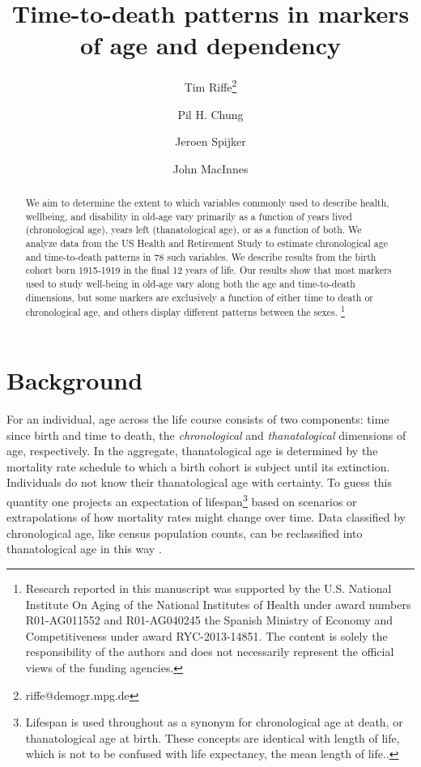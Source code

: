 \documentclass[11pt,oneside]{article} %
\newcommand\ackn[1]{%
  \begingroup
  \renewcommand\thefootnote{}\footnote{#1}%
  \addtocounter{footnote}{-1}%
  \endgroup
}
\begin{document}
\title{Time-to-death patterns in markers of age and dependency}

\author[1]{Tim Riffe\thanks{riffe@demogr.mpg.de}}
\author[1]{Pil H. Chung}
\author[2]{Jeroen Spijker}
\author[3]{John MacInnes}



\maketitle

\begin{abstract}
We aim to determine the extent to which variables commonly
used to describe health, wellbeing, and disability in old-age vary primarily
as a function of years lived (chronological age), years left (thanatological
age), or as a function of both.
We analyze data from the US Health and Retirement Study to estimate chronological age and time-to-death patterns in 78 such variables. We describe
results from the birth cohort born 1915-1919 in the final 12 years of life. Our results show
that most markers used to study well-being in old-age vary along both the age
and time-to-death dimensions, but some markers are exclusively a function of
either time to death or chronological age, and others display different patterns
between the sexes.\ackn{Research reported in this manuscript
was supported by the U.S.
National Institute On Aging of the National Institutes of Health under award
numbers R01-AG011552 and R01-AG040245 the Spanish Ministry of Economy and
Competitiveness under award RYC-2013-14851. The content is solely the
responsibility of the authors and does not necessarily represent the official views of the funding agencies.}
\end{abstract}

\section*{Background}

For an
individual, age across the life course consists of two components: time since
birth and time to death, the \textit{chronological} and \textit{thanatalogical}
dimensions of age, respectively. In the aggregate, thanatological age is determined
by the mortality rate schedule to which a birth cohort is subject until its
extinction. Individuals do not know their thanatological age with certainty. To
guess this quantity one projects an expectation of lifespan\footnote{Lifespan
is used throughout as a synonym for chronological age at death, or
thanatological age at birth. These concepts are identical with length of life,
which is not to be confused with life expectancy, the mean length of life..}
based on scenarios or extrapolations of how mortality rates might change over time. Data classified by chronological age, like census population counts, can be reclassified into thanatological age in this way \citep{brouard1986structure}.
\end{document}

